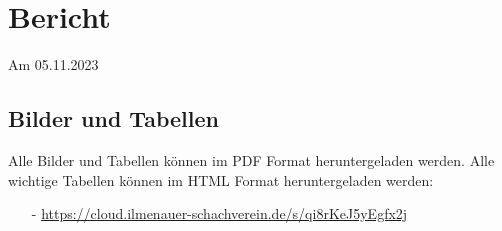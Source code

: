 \documentclass[a4paper,german]{tui-algo-seminar}
\title{\inhalt}
\author{Erik Skopp}
\newcommand{\inhalt}{28. Magdeburger A-Open 2023}
\begin{document}
\maketitle
\thispagestyle{plain} %
\begin{abstract}
Bericht: \inhalt.\\
Das 
\end{abstract}

\section{Bericht}
Am 05.11.2023 

\subsection{Bilder und Tabellen}
Alle Bilder und Tabellen können im PDF Format heruntergeladen werden. Alle wichtige Tabellen können im HTML Format heruntergeladen werden: \\
\begin{itemize}
    \item[-] \hyperlink{https://cloud.ilmenauer-schachverein.de/s/qi8rKeJ5yEgfx2j}{https://cloud.ilmenauer-schachverein.de/s/qi8rKeJ5yEgfx2j}
\end{itemize}
\end{document}
